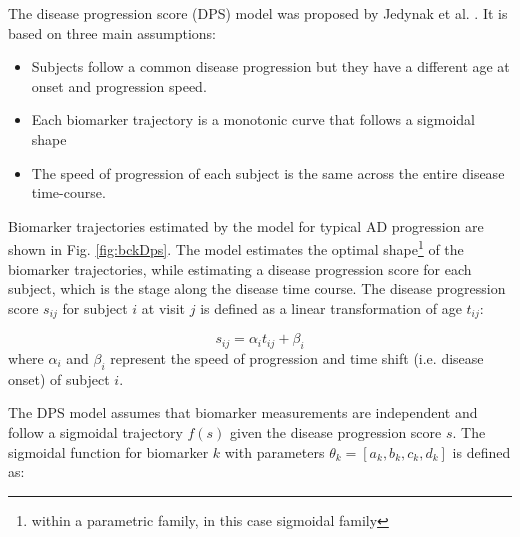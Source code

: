 The disease progression score (DPS) model was proposed by Jedynak et al. \cite{jedynak2012computational}. It is based on three main assumptions:
\begin{itemize}
 \item Subjects follow a common disease progression but they have a different age at onset and progression speed.
 \item Each biomarker trajectory is a monotonic curve that follows a sigmoidal shape
 \item The speed of progression of each subject is the same across the entire disease time-course.
\end{itemize}

Biomarker trajectories estimated by the model for typical AD progression are shown in Fig. \ref{fig:bckDps}. The model estimates the optimal shape\footnote{within a parametric family, in this case sigmoidal family} of the biomarker trajectories, while estimating a disease progression score for each subject, which is the stage along the disease time course. The disease progression score $s_{ij}$ for subject $i$ at visit $j$ is defined as a linear transformation of age $t_{ij}$:

\begin{equation}
\label{eq:dps}
 s_{ij} = \alpha_i t_{ij} + \beta_i
\end{equation}
where $\alpha_i$ and $\beta_i$ represent the speed of progression and time shift (i.e. disease onset) of subject $i$. 

The DPS model assumes that biomarker measurements are independent and follow a sigmoidal trajectory $f(s)$ given the disease progression score $s$. The sigmoidal function for biomarker $k$ with parameters $\theta_k = [a_k,b_k,c_k,d_k]$ is defined as:

